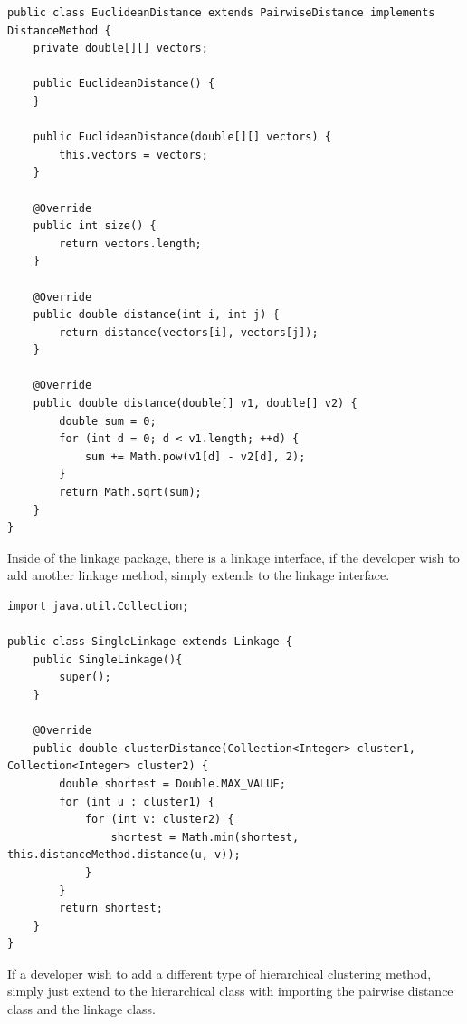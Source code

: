\documentclass[]{final_report}
\begin{document}
\begin{verbatim}
public class EuclideanDistance extends PairwiseDistance implements DistanceMethod {
    private double[][] vectors;

    public EuclideanDistance() {
    }

    public EuclideanDistance(double[][] vectors) {
        this.vectors = vectors;
    }

    @Override
    public int size() {
        return vectors.length;
    }

    @Override
    public double distance(int i, int j) {
        return distance(vectors[i], vectors[j]);
    }

    @Override
    public double distance(double[] v1, double[] v2) {
        double sum = 0;
        for (int d = 0; d < v1.length; ++d) {
            sum += Math.pow(v1[d] - v2[d], 2);
        }
        return Math.sqrt(sum);
    }
}
\end{verbatim}

Inside of the linkage package, there is a linkage interface, if the developer wish to add another linkage method, simply extends to the linkage interface.

\begin{verbatim}
import java.util.Collection;

public class SingleLinkage extends Linkage {
    public SingleLinkage(){
        super();
    }

    @Override
    public double clusterDistance(Collection<Integer> cluster1, Collection<Integer> cluster2) {
        double shortest = Double.MAX_VALUE;
        for (int u : cluster1) {
            for (int v: cluster2) {
                shortest = Math.min(shortest, this.distanceMethod.distance(u, v));
            }
        }
        return shortest;
    }
}
\end{verbatim}

If a developer wish to add a different type of hierarchical clustering method, simply just extend to the hierarchical class with importing the pairwise distance class and the linkage class.
\end{document}
